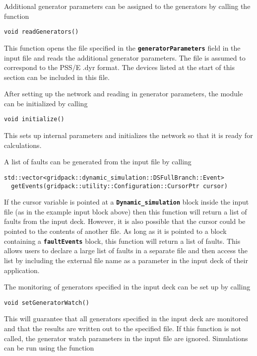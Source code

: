 Additional generator parameters can be assigned to the generators by calling the function

{
\color{red}
\begin{Verbatim}[fontseries=b]
void readGenerators()
\end{Verbatim}
}

This function opens the file specified in the \texttt{\textbf{generatorParameters}} field in the input file and reads the additional generator parameters. The file is assumed to correspond to the PSS/E .dyr format. The devices listed at the start of this section can be included in this file.

After setting up the network and reading in generator parameters, the module can be initialized by calling

{
\color{red}
\begin{Verbatim}[fontseries=b]
void initialize()
\end{Verbatim}
}

This sets up internal parameters and initializes the network so that it is ready for calculations.

A list of faults can be generated from the input file by calling

{
\color{red}
\begin{Verbatim}[fontseries=b]
std::vector<gridpack::dynamic_simulation::DSFullBranch::Event>
  getEvents(gridpack::utility::Configuration::CursorPtr cursor)
\end{Verbatim}
}

If the cursor variable is pointed at a \texttt{\textbf{Dynamic\_simulation}} block inside the input file (as in the example input block above) then this function will return a list of faults from the input deck. However, it is also possible that the cursor could be pointed to the contents of another file. As long as it is pointed to a block containing a \texttt{\textbf{faultEvents}} block, this function will return a list of faults. This allows users to declare a large list of faults in a separate file and then access the list by including the external file name as a parameter in the input deck of their application.

The monitoring of generators specified in the input deck can be set up by calling

{
\color{red}
\begin{Verbatim}[fontseries=b]
void setGeneratorWatch()
\end{Verbatim}
}

This will guarantee that all generators specified in the input deck are monitored and that the results are written out to the specified file. If this function is not called, the generator watch parameters in the input file are ignored.
Simulations can be run using the function

